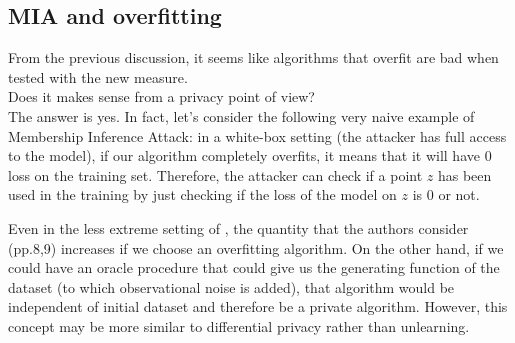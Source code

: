 


\subsection*{MIA and overfitting} 
From the previous discussion, it seems like algorithms that overfit are bad when tested with the new measure. \\
Does it makes sense from a privacy point of view?\\
The answer is yes. In fact, let's consider the following very naive example of Membership Inference Attack:
in a white-box setting (the attacker has full access to the model), if our algorithm completely overfits, it means that it will have $0$ loss on the training set.
Therefore, the attacker can check if a point $z$ has been used in the training by just checking if the loss of the model on $z$ is $0$ or not.

Even in the less extreme setting of \cite{aubinais_MIA_2025}, the quantity that the authors consider (pp.8,9) increases if we choose an overfitting algorithm.
On the other hand, if we could have an oracle procedure that could give us the generating function of the dataset (to which observational noise is added),
that algorithm would be independent of initial dataset and therefore be a private algorithm.
However, this concept may be more similar to differential privacy rather than unlearning.

